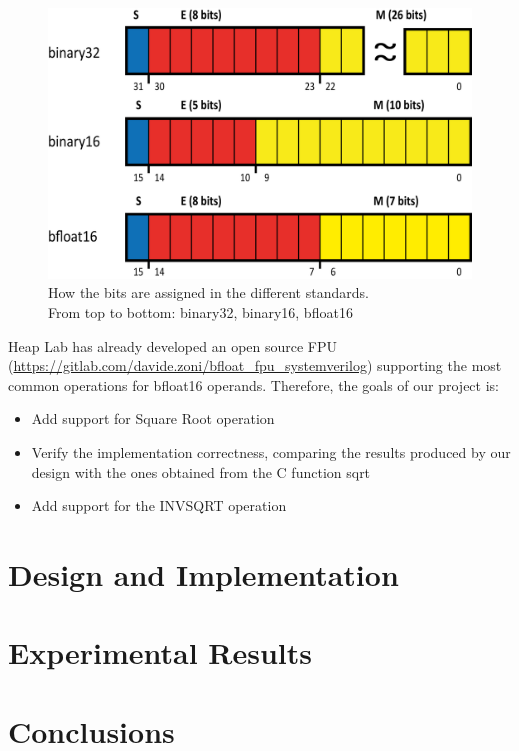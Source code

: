 \documentclass[12pt]{article}
\begin{document}
\begin{figure}[h]
\centering
\captionsetup{justification=centering}
\includegraphics{float.png}	
\caption{How the bits are assigned in the different standards. \\From top to bottom: binary32, binary16, bfloat16}
\end{figure}

Heap Lab has already developed an open source FPU (\url{https://gitlab.com/davide.zoni/bfloat_fpu_systemverilog}) supporting the most common operations for bfloat16 operands. Therefore, the goals of our project is:
\begin{itemize}
\item Add support for Square Root operation
\item Verify the implementation correctness, comparing the results produced by our design with the ones obtained from the C function sqrt
\item Add support for the INVSQRT operation
\end{itemize}

\section{Design and Implementation}

\section{Experimental Results}

\section{Conclusions}
\end{document}
